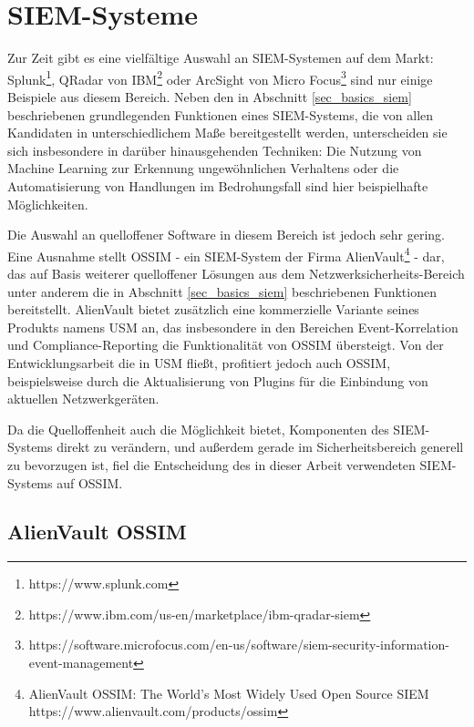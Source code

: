 \section{SIEM-Systeme}

\label{sec_state_siem}

Zur Zeit gibt es eine vielfältige Auswahl an SIEM-Systemen auf dem Markt: Splunk\footnote{
  https://www.splunk.com
}, QRadar von IBM\footnote{
  https://www.ibm.com/us-en/marketplace/ibm-qradar-siem
} oder ArcSight von Micro Focus\footnote{
  https://software.microfocus.com/en-us/software/siem-security-information-event-management
} sind nur einige Beispiele aus diesem Bereich. Neben den in Abschnitt \ref{sec_basics_siem} beschriebenen grundlegenden Funktionen eines SIEM-Systems, die von allen Kandidaten in unterschiedlichem Maße bereitgestellt werden, unterscheiden sie sich insbesondere in darüber hinausgehenden Techniken: Die Nutzung von Machine Learning zur Erkennung ungewöhnlichen Verhaltens oder die Automatisierung von Handlungen im Bedrohungsfall sind hier beispielhafte Möglichkeiten.

Die Auswahl an quelloffener Software in diesem Bereich ist jedoch sehr gering. Eine Ausnahme stellt OSSIM - ein SIEM-System der Firma AlienVault\footnote{
	AlienVault OSSIM: The World’s Most Widely Used Open Source SIEM\\https://www.alienvault.com/products/ossim
} - dar, das auf Basis weiterer quelloffener Lösungen aus dem Netzwerksicherheits-Bereich unter anderem die in Abschnitt \ref{sec_basics_siem} beschriebenen Funktionen bereitstellt. AlienVault bietet zusätzlich eine kommerzielle Variante seines Produkts namens USM an, das insbesondere in den Bereichen Event-Korrelation und Compliance-Reporting die Funktionalität von OSSIM übersteigt. Von der Entwicklungsarbeit die in USM fließt, profitiert jedoch auch OSSIM, beispielsweise durch die Aktualisierung von Plugins für die Einbindung von aktuellen Netzwerkgeräten.

Da die Quelloffenheit auch die Möglichkeit bietet, Komponenten des SIEM-Systems direkt zu verändern, und außerdem gerade im Sicherheitsbereich generell zu bevorzugen ist, fiel die Entscheidung des in dieser Arbeit verwendeten SIEM-Systems auf OSSIM.

\subsection{AlienVault OSSIM}

\label{subsec_state_siem_overview}

